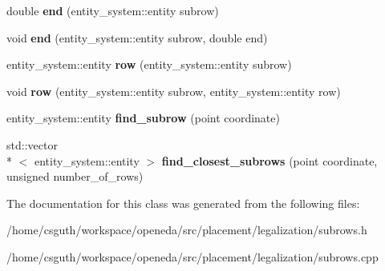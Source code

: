 \begin{DoxyCompactItemize}
\item 
\hypertarget{classophidian_1_1placement_1_1legalization_1_1subrows_a3a3180b94ad845bd97131b9b8e4b45cc}{double {\bfseries end} (entity\-\_\-system\-::entity subrow)}\label{classophidian_1_1placement_1_1legalization_1_1subrows_a3a3180b94ad845bd97131b9b8e4b45cc}

\item 
\hypertarget{classophidian_1_1placement_1_1legalization_1_1subrows_a03c1276c41d70c6153f612144e9f7c83}{void {\bfseries end} (entity\-\_\-system\-::entity subrow, double end)}\label{classophidian_1_1placement_1_1legalization_1_1subrows_a03c1276c41d70c6153f612144e9f7c83}

\item 
\hypertarget{classophidian_1_1placement_1_1legalization_1_1subrows_a39d3d72b3a2732a84736c8d11a4b2588}{entity\-\_\-system\-::entity {\bfseries row} (entity\-\_\-system\-::entity subrow)}\label{classophidian_1_1placement_1_1legalization_1_1subrows_a39d3d72b3a2732a84736c8d11a4b2588}

\item 
\hypertarget{classophidian_1_1placement_1_1legalization_1_1subrows_a58e08477088f5e80a66e0594c579ed45}{void {\bfseries row} (entity\-\_\-system\-::entity subrow, entity\-\_\-system\-::entity row)}\label{classophidian_1_1placement_1_1legalization_1_1subrows_a58e08477088f5e80a66e0594c579ed45}

\item 
\hypertarget{classophidian_1_1placement_1_1legalization_1_1subrows_a4f679cfc865487921364a8b8a088f988}{entity\-\_\-system\-::entity {\bfseries find\-\_\-subrow} (point coordinate)}\label{classophidian_1_1placement_1_1legalization_1_1subrows_a4f679cfc865487921364a8b8a088f988}

\item 
\hypertarget{classophidian_1_1placement_1_1legalization_1_1subrows_a1a0cbbf2a24f49abb96b54d14eaf3a19}{std\-::vector\\*
$<$ entity\-\_\-system\-::entity $>$ {\bfseries find\-\_\-closest\-\_\-subrows} (point coordinate, unsigned number\-\_\-of\-\_\-rows)}\label{classophidian_1_1placement_1_1legalization_1_1subrows_a1a0cbbf2a24f49abb96b54d14eaf3a19}

\end{DoxyCompactItemize}


The documentation for this class was generated from the following files\-:\begin{DoxyCompactItemize}
\item 
/home/csguth/workspace/openeda/src/placement/legalization/subrows.\-h\item 
/home/csguth/workspace/openeda/src/placement/legalization/subrows.\-cpp\end{DoxyCompactItemize}
